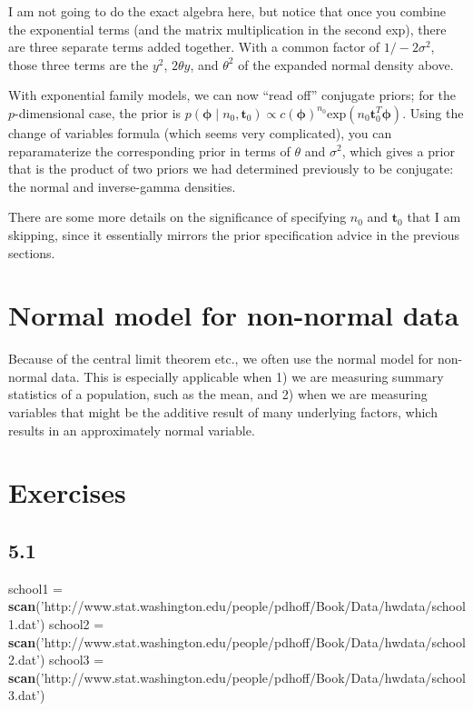 \documentclass[]{article}
\newenvironment{Shaded}{\begin{snugshade}}{\end{snugshade}}
\newcommand{\KeywordTok}[1]{\textcolor[rgb]{0.13,0.29,0.53}{\textbf{#1}}}
\newcommand{\NormalTok}[1]{#1}
\newcommand{\StringTok}[1]{\textcolor[rgb]{0.31,0.60,0.02}{#1}}
\begin{document}
I am not going to do the exact algebra here, but notice that once you
combine the exponential terms (and the matrix multiplication in the
second exp), there are three separate terms added together. With a
common factor of \(1 / -2\sigma^2\), those three terms are the \(y^2\),
\(2 \theta y\), and \(\theta^2\) of the expanded normal density above.

With exponential family models, we can now ``read off'' conjugate
priors; for the \(p\)-dimensional case, the prior is
\(p(\boldsymbol{\phi} \mid n_0, \mathbf{t}_0) \propto c(\boldsymbol{\phi})^{n_0} \text{exp}(n_0 \mathbf{t}_0^T \boldsymbol{\phi})\).
Using the change of variables formula (which seems very complicated),
you can reparamaterize the corresponding prior in terms of \(\theta\)
and \(\sigma^2\), which gives a prior that is the product of two priors
we had determined previously to be conjugate: the normal and
inverse-gamma densities.

There are some more details on the significance of specifying \(n_0\)
and \(\mathbf{t}_0\) that I am skipping, since it essentially mirrors
the prior specification advice in the previous sections.

\hypertarget{normal-model-for-non-normal-data}{%
\section{Normal model for non-normal
data}\label{normal-model-for-non-normal-data}}

Because of the central limit theorem etc., we often use the normal model
for non-normal data. This is especially applicable when 1) we are
measuring summary statistics of a population, such as the mean, and 2)
when we are measuring variables that might be the additive result of
many underlying factors, which results in an approximately normal
variable.

\hypertarget{exercises}{%
\section{Exercises}\label{exercises}}

\hypertarget{section}{%
\subsection{5.1}\label{section}}

\begin{Shaded}
\begin{Highlighting}[]
\NormalTok{school1 =}\StringTok{ }\KeywordTok{scan}\NormalTok{(}\StringTok{'http://www.stat.washington.edu/people/pdhoff/Book/Data/hwdata/school1.dat'}\NormalTok{)}
\NormalTok{school2 =}\StringTok{ }\KeywordTok{scan}\NormalTok{(}\StringTok{'http://www.stat.washington.edu/people/pdhoff/Book/Data/hwdata/school2.dat'}\NormalTok{)}
\NormalTok{school3 =}\StringTok{ }\KeywordTok{scan}\NormalTok{(}\StringTok{'http://www.stat.washington.edu/people/pdhoff/Book/Data/hwdata/school3.dat'}\NormalTok{)}
\end{Highlighting}
\end{Shaded}
\end{document}
